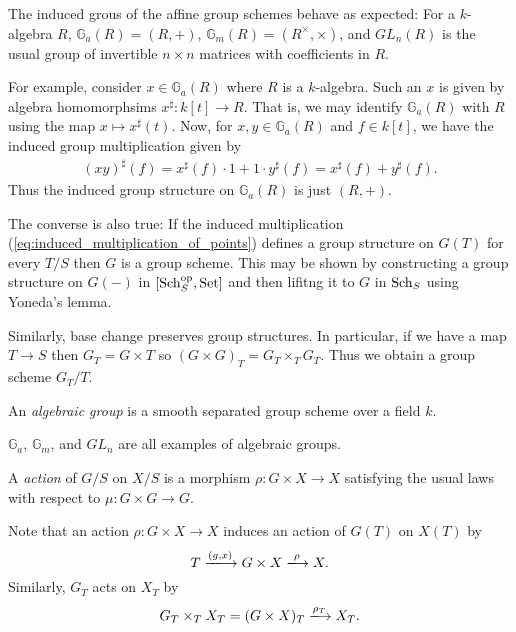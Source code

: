 \documentclass{article}
\begin{document}
\begin{example}
  The induced grous of the affine group schemes behave as expected:
  For a $k$-algebra $R$, $\mathbb{G}_a(R) = (R,+)$,
  $\mathbb{G}_m(R) = (R^\times,\times)$, and
  $GL_n(R)$ is the usual group of invertible $n\times n$ matrices
  with coefficients in $R$.

  For example, consider $x\in\mathbb{G}_a(R)$ where $R$ is
  a $k$-algebra. Such an $x$ is given by algebra homomorphsims
  $x^\sharp:k[t] \to R$. That is, we may identify $\mathbb{G}_a(R)$
  with $R$ using the map $x \mapsto x^\sharp(t)$. Now, for
  $x,y\in\mathbb{G}_a(R)$ and $f\in k[t]$, we have the induced group
  multiplication given by
  \begin{align*}
    (xy)^\sharp(f)
    = x^\sharp(f) \cdot 1 + 1 \cdot y^\sharp(f)
    = x^\sharp(f) + y^\sharp(f).
  \end{align*}
  Thus the induced group structure on $\mathbb{G}_a(R)$ is just $(R,+)$.
\end{example}

The converse is also true: If the induced multiplication
(\ref{eq:induced_multiplication_of_points}) defines a group structure
on $G(T)$ for every $T/S$ then $G$ is a group scheme. This may be
shown by constructing a group structure on $G(-)$ in
$[{\operatorname{Sch}}^\text{op}_S,\operatorname{Set}]$ and then lifitng it to $G$ in $\operatorname{Sch}_S$ using
Yoneda's lemma.

Similarly, base change preserves group structures.
In particular, if we have a map $T\to S$ then $G_T = G\times T$
so $(G\times G)_T = G_T \times_T G_T$. Thus we obtain a group
scheme $G_T/T$.

\begin{definition}
  An \emph{algebraic group} is a smooth separated
  group scheme over a field $k$.
\end{definition}

\begin{example}
  $\mathbb{G}_a$, $\mathbb{G}_m$, and $GL_n$ are all examples of algebraic
  groups. \missingproof
\end{example}

\begin{definition}
  A \emph{action} of $G/S$ on $X/S$ is a morphism
  $\rho : G\times X\to X$ satisfying the usual laws with respect
  to $\mu:G\times G\to G$.

\end{definition}

Note that an action $\rho : G\times X\to X$ induces an action of
$G(T)$ on $X(T)$ by
\begin{equation*}
  T \xlongrightarrow{(g,x)} G\times X \xlongrightarrow{\rho} X.
\end{equation*}
Similarly, $G_T$ acts on $X_T$ by
\begin{align*}
  G_T \times_T X_T = (G \times X)_T \xlongrightarrow{\rho_T} X_T.
\end{align*}
\end{document}
